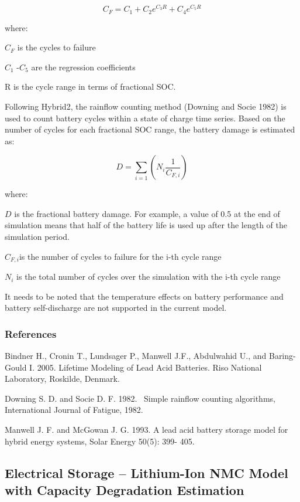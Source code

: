 \begin{equation}
{C_F} = {C_1} + {C_2}{e^{{C_3}R}} + {C_4}{e^{{C_5}R}}
\end{equation}

where:

\({C_F}\) is the cycles to failure

\({C_1}\) -\({C_5}\) are the regression coefficients

R is the cycle range in terms of fractional SOC.

Following Hybrid2, the rainflow counting method (Downing and Socie 1982) is used to count battery cycles within a state of charge time series. Based on the number of cycles for each fractional SOC range, the battery damage is estimated as:

\begin{equation}
D = \sum\limits_{i = 1}^{} {\left( {{N_i}\frac{1}{{{C_{F,i}}}}} \right)}
\end{equation}

where:

\(D\) is the fractional battery damage. For example, a value of 0.5 at the end of simulation means that half of the battery life is used up after the length of the simulation period.

\({C_{F,i}}\)is the number of cycles to failure for the i-th cycle range

\({N_i}\) is the total number of cycles over the simulation with the i-th cycle range

It needs to be noted that the temperature effects on battery performance and battery self-discharge are not supported in the current model.

\subsubsection{References}\label{references-021}

Bindner H., Cronin T., Lundsager P., Manwell J.F., Abdulwahid U., and Baring-Gould I. 2005. Lifetime Modeling of Lead Acid Batteries. Riso National Laboratory, Roskilde, Denmark.

\noindent
Downing S. D. and Socie D. F. 1982.~ Simple rainflow counting algorithms, International Journal of Fatigue, 1982.

\noindent
Manwell J. F. and McGowan J. G. 1993. A lead acid battery storage model for hybrid energy systems, Solar Energy 50(5): 399- 405.

\subsection{Electrical Storage – Lithium-Ion NMC Model with Capacity Degradation Estimation}

